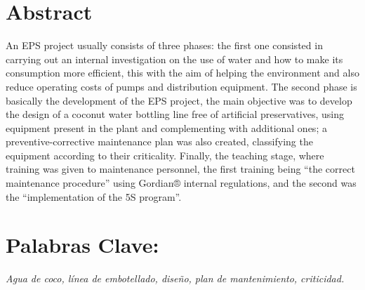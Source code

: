 \documentclass[11pt,spanish,Letterpaper,openany]{book}
\begin{document}
\hypertarget{abstract-2}{%
\section*{Abstract}\label{abstract-2}}

An EPS project usually consists of three phases: the first one consisted in carrying out an internal investigation on the use of water and how to make its consumption more efficient, this with the aim of helping the environment and also reduce operating costs of pumps and distribution equipment. The second phase is basically the development of the EPS project, the main objective was to develop the design of a coconut water bottling line free of artificial preservatives, using equipment present in the plant and complementing with additional ones; a preventive-corrective maintenance plan was also created, classifying the equipment according to their criticality. Finally, the teaching stage, where training was given to maintenance personnel, the first training being ``the correct maintenance procedure'' using Gordian® internal regulations, and the second was the ``implementation of the 5S program''.

\hypertarget{palabras-clave-2}{%
\section*{Palabras Clave:}\label{palabras-clave-2}}

\emph{Agua de coco, línea de embotellado, diseño, plan de mantenimiento, criticidad.}
\end{document}
